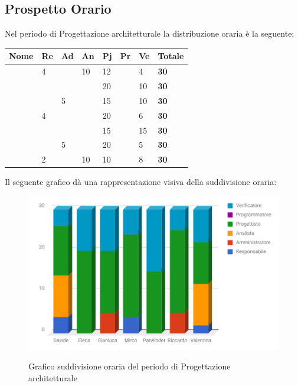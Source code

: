 \documentclass[PianoDiProgetto.tex]{subfiles}
\begin{document}
\subsection{Prospetto Orario}
Nel periodo di Progettazione architetturale la distribuzione oraria è la seguente:
\begin{center}
\begin{table}[htbp]
	\centering
	\renewcommand\arraystretch{1.5}
	\begin{tabularx}{\textwidth}{p{4cm}|p{1cm}|p{1cm}|p{1cm}|p{1cm}|p{1cm}|p{1cm}|p{2cm}}
		\hline
		\textbf{Nome} & \textbf{Re} & \textbf{Ad} & \textbf{An} & \textbf{Pj} & \textbf{Pr} & \textbf{Ve} & \textbf{Totale} \\
		\hline
		\Davide & 4 & \ & 10 & 12 & \ & 4 & \textbf{30} \\
		\hline
		\Elena & \ & \ & \ & 20 & \ & 10 & \textbf{30} \\
		\hline
		\Gianluca & \ & 5 & \ & 15 & \ & 10 & \textbf{30} \\
		\hline
		\Mirco & 4 & \ & \ & 20 & \ & 6 & \textbf{30} \\
		\hline
		\Parwinder & \ & \ & \ & 15 & \ & 15 & \textbf{30} \\
		\hline
		\Riccardo & \ & 5 & \ & 20 & \ & 5 & \textbf{30} \\
		\hline
		\Valentina & 2 & \ & 10 & 10 & \ & 8 & \textbf{30} \\
		\hline
	\end{tabularx}
\end{table}
\end{center}
Il seguente grafico dà una rappresentazione visiva della suddivisione oraria:
\begin{figure}[h]
	\centering
	\includegraphics[width=12.5cm]{images/prospettoOrario/progArch.png}
	\label{fig:foo}
	\caption{Grafico suddivisione oraria del periodo di Progettazione architetturale}
\end{figure} 
\newpage
\end{document}
